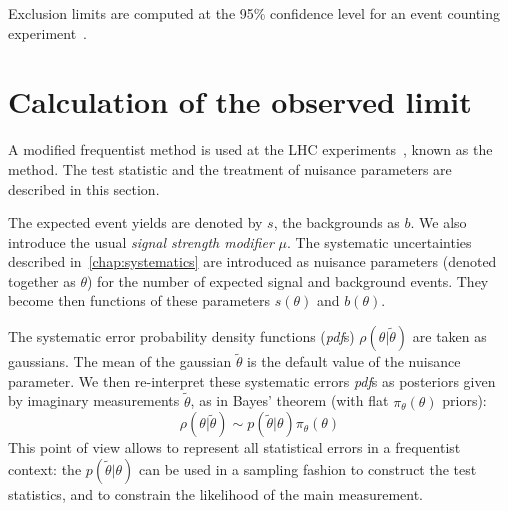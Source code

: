 Exclusion limits are computed at the 95\% confidence level for an event
counting experiment~\cite{2010acat.confE..57M}.

\section{Calculation of the observed limit}
A modified frequentist method is used at the LHC
experiments~\cite{ATLAS:1379837}, known as the \CLs method.
The test statistic and the treatment of nuisance parameters are described in
this section.

The expected \TP event yields are denoted by $s$, the backgrounds as
$b$. We also introduce the usual \emph{signal strength modifier} $\mu$.
The systematic uncertainties described in~\ref{chap:systematics} are
introduced as nuisance parameters (denoted together as $\theta$) for the number of expected signal and
background events. They become then functions of these parameters
$s(\theta)$ and $b(\theta)$.

The systematic error probability density functions (\emph{pdf}s) $\rho(\theta | \tilde\theta)$ are taken as
gaussians. The mean of the gaussian $\tilde \theta$ is the default value of
the nuisance parameter.
We then re-interpret these systematic errors \emph{pdf}s as posteriors given
by imaginary measurements $\tilde \theta$, as in Bayes' theorem (with flat
$\pi_\theta(\theta)$ priors):
\begin{equation*}
    \rho(\theta|\tilde \theta) \sim p(\tilde \theta | \theta)
    \pi_\theta(\theta)
\end{equation*}
This point of view allows to represent all statistical errors in a
frequentist context: the $p(\tilde \theta|\theta)$ can be used in a sampling
fashion to construct the test statistics, and to constrain the likelihood of
the main measurement.

